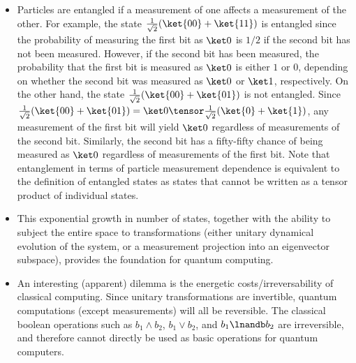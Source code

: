 \documentclass{slides}
\begin{document}
\begin{slide}{}

\begin{itemize}
\item Particles are entangled if a measurement of one
affects a measurement of the other. For example, the state 
$\frac{1}{\sqrt{2}}(\ket{00}+\ket{11})$ is entangled since the 
probability of measuring the first bit as $\ket 0$ is $1/2$ 
if the second bit has not been measured. However, if the second bit
has been measured, the probability that the first bit is 
measured as $\ket 0$ is either $1$ or $0$, depending on whether the
second bit was measured as $\ket 0$ or $\ket 1$, respectively. On the other hand, the state
$\frac{1}{\sqrt{2}}(\ket{00}+\ket{01})$ is not entangled. Since 
$\frac{1}{\sqrt{2}}(\ket{00}+\ket{01}) = \ket 0\tensor \frac{1}{\sqrt{2}}(\ket{0}+\ket{1})$, any 
measurement of the first bit will yield $\ket 0$ regardless of
measurements of the second bit.  Similarly, the second bit has a 
fifty-fifty chance of being measured as $\ket 0$ regardless of 
measurements of the first bit. Note that entanglement in terms of particle measurement dependence is equivalent to the definition of entangled
states as states that cannot be written as a tensor product of individual
states.
\end{itemize}

\end{slide}


\begin{slide}{}
\begin{itemize}

	\item This exponential growth in number of states, together with the ability to subject the entire space to transformations (either unitary dynamical evolution of the system, or a measurement projection into an eigenvector subspace), provides the foundation for quantum computing.
	\item An interesting (apparent) dilemma is the energetic costs/irreversability of classical computing.  Since unitary transformations are invertible, quantum computations (except measurements) will all be reversible.  The classical boolean operations such as $b_1\land b_2$, $b_1\lor b_2$, and $b_1\lnandb b_2$ are irreversible, and therefore cannot directly be used as basic operations for quantum computers.

\end{itemize}

\end{slide}
\end{document}
